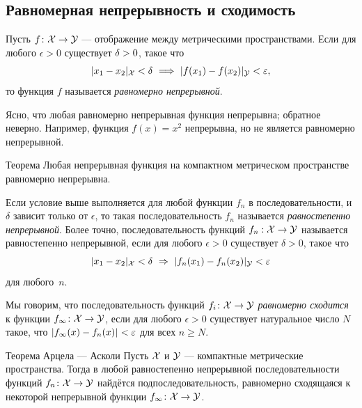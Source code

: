 {\subsection*{Равномерная непрерывность и сходимость}

Пусть $f\colon{\mathcal{X}}\to \mathcal{Y}$ --- отображение между метрическими пространствами.
Если для любого $\epsilon>0$ существует $\delta\z>0$, такое что
\[\dist{x_1}{x_2}{\spc{X}}<\delta\ \Longrightarrow\ \dist{f(x_1)}{f(x_2)}{\spc{Y}}<\epsilon,\]
то функция $f$ называется \emph{равномерно непрерывной}.

Ясно, что любая равномерно непрерывная функция непрерывна;
обратное неверно.
Например, функция $f(x)=x^2$ непрерывна, но не является равномерно непрерывной.

{\sloppy

\begin{thm}{Теорема}
Любая непрерывная функция на компактном метрическом пространстве равномерно непрерывна.
\end{thm}

}

Если условие выше выполняется для любой функции $f_n$ в последовательности, и $\delta$ зависит только от $\epsilon$,
то такая последовательность $f_n$ называется \emph{равностепенно непрерывной}.
Более точно, 
последовательность функций $f_n:{\mathcal{X}}\to \mathcal{Y}$ называется равностепенно непрерывной, если 
для любого $\epsilon>0$ существует $\delta>0$, такое что 
\[\dist{x_1}{x_2}{\spc{X}}<\delta\ \Rightarrow\ \dist{f_n(x_1)}{f_n(x_2)}{\spc{Y}}<\epsilon\]
для любого~$n$.

Мы говорим, что последовательность функций $f_i\colon {\mathcal{X}} \to \mathcal{Y}$ \emph{равномерно сходится} к функции $f_{\infty}\colon {\mathcal{X}} \to \mathcal{Y}$, если для любого 
$\epsilon>0$ существует натуральное число $N$ такое, что $\dist{f_{\infty}(x)}{f_n (x)}{}<\epsilon$ для всех $n \ge N$.

{\sloppy

\begin{thm}{Теорема Арцела --- Асколи}\label{lem:equicontinuous}
Пусть $\mathcal{X}$ и $\mathcal{Y}$ --- компактные метрические пространства. 
Тогда в любой равностепенно непрерывной последовательности функций $f_n\:\spc{X}\z\to \spc{Y}$ найдётся подпоследовательность, равномерно сходящаяся к некоторой непрерывной функции $f_\infty\:\spc{X}\z\to \spc{Y}$. 
\end{thm}

}}
